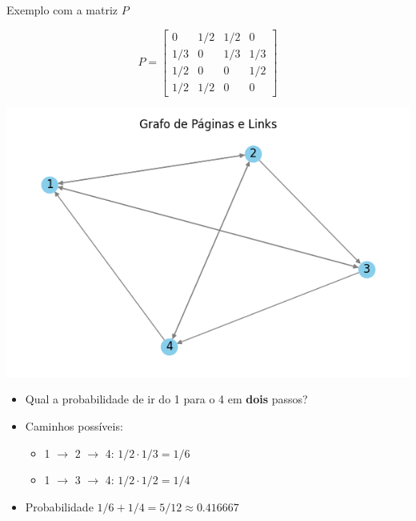 \documentclass{beamer}
\begin{document}
\begin{frame}{Exemplo com a matriz $P$}

  \begin{minipage}[h]{.45\linewidth}
  \[ P = \begin{bmatrix}
      0 & {1}/{2} & {1}/{2} & 0 \\
      {1}/{3} & 0 & {1}/{3} & {1}/{3} \\
      {1}/{2} & 0 & 0 & {1}/{2} \\
      {1}/{2} & {1}/{2} & 0 & 0
    \end{bmatrix} \]
\end{minipage}
\begin{minipage}[h]{.5\linewidth}
  \includegraphics[width=1.1\textwidth]{web_grafo.png}
\end{minipage}


 

  \begin{itemize}
  \item Qual a probabilidade de ir do  1 para o  4 em \textbf{dois} passos? \pause
  \item Caminhos possíveis:
    \begin{itemize}
    \item 1 $\to$ 2 $\to$ 4: ${1}/{2} \cdot {1}/{3} = {1}/{6}$
    \item 1 $\to$ 3 $\to$ 4: ${1}/{2} \cdot {1}/{2} = {1}/{4}$
    \end{itemize}
  \item  Probabilidade ${1}/{6} + {1}/{4} = {5}/{12} \approx 0.416667$
  \end{itemize}
\end{frame}

\end{document}
